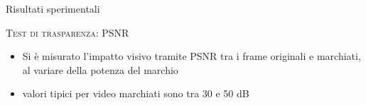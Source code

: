 \documentclass{beamer}
\begin{document}
\begin{section}{Risultati sperimentali}
\begin{frame}[t]{\textsc{Test di trasparenza: PSNR}}
\begin{block}{}
\begin{itemize}
\item Si \`{e} misurato l'impatto visivo tramite PSNR tra i frame originali e marchiati, al variare della potenza del marchio
\item valori tipici per video marchiati sono tra 30 e 50 dB
\end{itemize}
\end{block}

\begin{table}
\vspace{2mm}
\end{table}
\end{frame}

\end{section}
\end{document}
